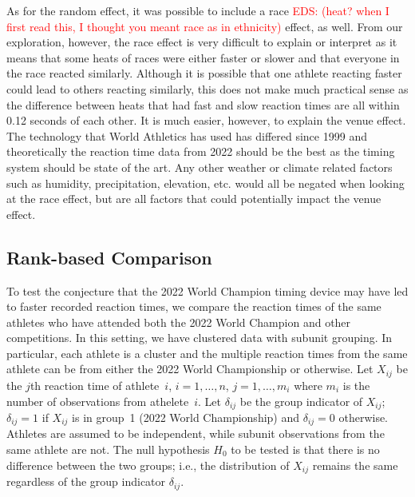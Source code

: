 \documentclass[12pt, letterpaper, titlepage]{article}
\newcommand{\eds}[1]{\textcolor{red}{EDS: (#1)}}
\begin{document}
As for the random effect, it was possible to include a race 
\eds{heat? when I first read this, I thought you meant race as in ethnicity} 
effect, as well.
From our exploration, however, the race effect is very difficult to explain or 
interpret as it means that some heats of races were either
faster or slower and that everyone in the race reacted similarly.  Although
it is possible that one athlete reacting faster could lead to others reacting
similarly, this does not make much practical sense as the difference between
heats that had fast and slow reaction times are all within 0.12 seconds of each
other.  It is much easier, however, to explain the venue effect.  The technology
that World Athletics has used has differed since 1999 and theoretically the
reaction time data from 2022 should be the best as the timing system should be
state of the art. Any other weather or climate related factors such as humidity,
precipitation, elevation, etc. would all be negated when looking at the race
effect, but are all factors that could potentially impact the venue effect.


\subsection{Rank-based Comparison}


To test the conjecture that the 2022 World Champion timing device may have led
to faster recorded reaction times, we compare the reaction times of the same
athletes who have attended both the 2022 World Champion and other competitions.
In this setting, we have clustered data with subunit grouping. In particular,
each athlete is a cluster and the multiple reaction times from the same athlete
can be from either the 2022 World Championship or otherwise.
Let $X_{ij}$ be the $j$th reaction time of athlete~$i$, $i = 1, \ldots, n$,
$j = 1, \ldots, m_i$ where $m_i$ is the number of observations from
athelete~$i$. Let $\delta_{ij}$ be the group indicator of $X_{ij}$; $\delta_{ij}
= 1$ if $X_{ij}$ is in group~1 (2022 World Championship) and $\delta_{ij} = 0$ 
otherwise. Athletes are
assumed to be independent, while subunit observations from the same athlete are
not. The null hypothesis $H_0$ to be tested is that there is no difference
between the two groups; i.e., the distribution of $X_{ij}$ remains the same
regardless of the group indicator $\delta_{ij}$.
\end{document}
